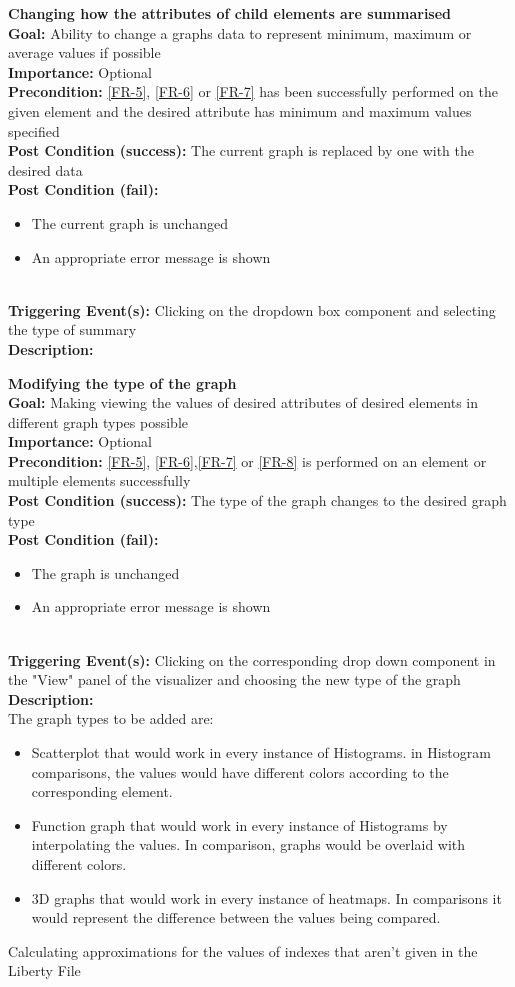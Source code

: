\documentclass[10pt,a4paper]{report}
\newcommand{\precondition}[1]{
    \textbf{Precondition: } #1 \leavevmode \\
}
\newcommand{\FRODescription}[8]{
    \textbf{#1} \leavevmode \\
    \textbf{Goal: } #2 \leavevmode \\
    \textbf{Importance: } #3 \leavevmode \\
    \precondition{#4}
    \textbf{Post Condition (success): } #5 \leavevmode \\
    \textbf{Post Condition (fail): } #6 \leavevmode \\
    \textbf{Triggering Event(s): } #7 \leavevmode \\
    \textbf{Description: } \leavevmode \\
    #8}
\begin{document}
\begin{FRO}
    \item \FRODescription{Changing how the attributes of child elements are summarised}
    {Ability to change a graphs data to represent minimum, maximum or average values if possible}
    {Optional}
    {\ref{FR-5}, \ref{FR-6} or \ref{FR-7} has been successfully performed on the given element and the desired attribute has minimum and maximum values specified}
    {The current graph is replaced by one with the desired data}
    {\begin{itemize}
        \item The current graph is unchanged
        \item An appropriate error message is shown
    \end{itemize}}
    {Clicking on the dropdown box component and selecting the type of summary}
    \item \FRODescription{Modifying the type of the graph}
    {Making viewing the values of desired attributes of desired elements in different graph types possible}
    {Optional}
    {\ref{FR-5}, \ref{FR-6},\ref{FR-7} or \ref{FR-8} is performed on an element or multiple elements successfully}
    {The type of the graph changes to the desired graph type}
    {\begin{itemize}
        \item The graph is unchanged
        \item An appropriate error message is shown
    \end{itemize}}
    {Clicking on the corresponding drop down component in the "View" panel of the visualizer and choosing the new type of the graph}
    {The graph types to be added are:
    \begin{itemize}
        \item Scatterplot that would work in every instance of Histograms. in Histogram comparisons, the values would have different colors according to the corresponding element.
        \item Function graph that would work in every instance of Histograms by interpolating the values. In comparison, graphs would be overlaid with different colors.
        \item 3D graphs that would work in every instance of heatmaps. In comparisons it would represent the difference between the values being compared.
    \end{itemize}}
    \item {}
    {Calculating approximations for the values of indexes that aren't given in the Liberty File}

\end{FRO}
\end{document}
